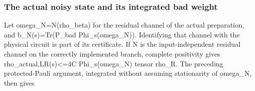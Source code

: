 \documentclass[
]{article}
\begin{document}
\subsubsection{The actual noisy state and its integrated bad
weight}\label{the-actual-noisy-state-and-its-integrated-bad-weight}

Let
o\allowbreak{}m\allowbreak{}e\allowbreak{}g\allowbreak{}a\allowbreak{}\_\allowbreak{}N\allowbreak{}=\allowbreak{}N\allowbreak{}(\allowbreak{}r\allowbreak{}h\allowbreak{}o\allowbreak{}\_\allowbreak{}b\allowbreak{}e\allowbreak{}t\allowbreak{}a\allowbreak{})
for the residual channel of the actual preparation, and
b\allowbreak{}\_\allowbreak{}N\allowbreak{}(\allowbreak{}s\allowbreak{})\allowbreak{}=\allowbreak{}T\allowbreak{}r\allowbreak{}(\allowbreak{}P\allowbreak{}\_\allowbreak{}b\allowbreak{}a\allowbreak{}d
P\allowbreak{}h\allowbreak{}i\allowbreak{}\_\allowbreak{}s\allowbreak{}(\allowbreak{}o\allowbreak{}m\allowbreak{}e\allowbreak{}g\allowbreak{}a\allowbreak{}\_\allowbreak{}N\allowbreak{})\allowbreak{})\allowbreak{}.
Identifying that channel with the physical circuit is part of its
certificate. If N is the input-independent residual channel on the
correctly implemented branch, complete positivity gives
r\allowbreak{}h\allowbreak{}o\allowbreak{}\_\allowbreak{}a\allowbreak{}c\allowbreak{}t\allowbreak{}u\allowbreak{}a\allowbreak{}l\allowbreak{},\allowbreak{}L\allowbreak{}R\allowbreak{}(\allowbreak{}s\allowbreak{})\allowbreak{}<\allowbreak{}=\allowbreak{}4\allowbreak{}C
Phi\_s(omega\_N) tensor rho\_R. The preceding protected-Pauli argument,
integrated without assuming stationarity of omega\_N, then gives
\end{document}
